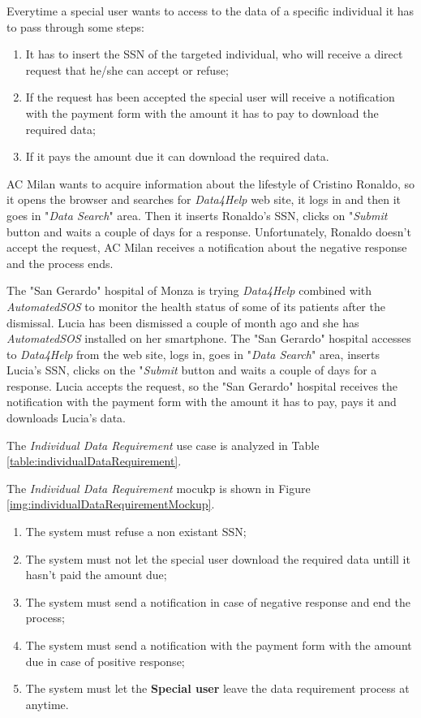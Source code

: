 Everytime a special user wants to access to the data of a specific individual it has to pass through some steps:
\begin{enumerate}
  \item It has to insert the SSN of the targeted individual, who will receive a direct request that he/she can accept or refuse;
  \item If the request has been accepted the special user will receive a notification with the payment form with the amount it has to pay to download the required data;
  \item If it pays the amount due it can download the required data.
\end{enumerate}

AC Milan wants to acquire information about the lifestyle of Cristino Ronaldo, so it opens the browser and searches for \textit{Data4Help} web site, it logs in and then it goes in "\textit{Data Search}" area. Then it inserts Ronaldo's SSN, clicks on "\textit{Submit} button and waits a couple of days for a response. Unfortunately, Ronaldo doesn't accept the request, AC Milan receives a notification about the negative response and the process ends.

The "San Gerardo" hospital of Monza is trying \textit{Data4Help} combined with \textit{AutomatedSOS} to monitor the health status of some of its patients after the dismissal. Lucia has been dismissed a couple of month ago and she has \textit{AutomatedSOS} installed on her smartphone. The "San Gerardo" hospital accesses to \textit{Data4Help} from the web site, logs in, goes in "\textit{Data Search}" area, inserts Lucia's SSN, clicks on the "\textit{Submit} button and waits a couple of days for a response. Lucia accepts the request, so the "San Gerardo" hospital receives the notification with the payment form with the amount it has to pay, pays it and downloads Lucia's data.

The \textit{Individual Data Requirement} use case is analyzed in Table \ref{table:individualDataRequirement}.

The \textit{Individual Data Requirement} mocukp is shown in Figure \ref{img:individualDataRequirementMockup}.

\begin{enumerate}
  \item The system must refuse a non existant SSN;
  \item The system must not let the special user download the required data untill it hasn't paid the amount due;
  \item The system must send a notification in case of negative response and end the process;
  \item The system must send a notification with the payment form with the amount due in case of positive response;
  \item The system must let the \textbf{Special user} leave the data requirement process at anytime.
\end{enumerate}

